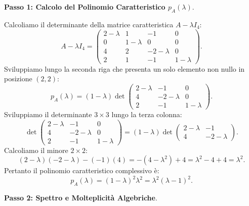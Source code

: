 \begin{dimostrazione}
\textbf{Passo 1: Calcolo del Polinomio Caratteristico $p_A(\lambda)$}.

Calcoliamo il determinante della matrice caratteristica $A - \lambda I_4$:
\begin{equation}
    A - \lambda I_4 = \begin{pmatrix}
        2 - \lambda & 1 & -1 & 0 \\
        0 & 1 - \lambda & 0 & 0 \\
        4 & 2 & -2 - \lambda & 0 \\
        2 & 1 & -1 & 1 - \lambda
    \end{pmatrix}.
\end{equation}
Sviluppiamo lungo la seconda riga che presenta un solo elemento non nullo in posizione $(2,2)$:
\begin{equation}
    p_A(\lambda) = (1 - \lambda) \det \begin{pmatrix}
        2 - \lambda & -1 & 0 \\
        4 & -2 - \lambda & 0 \\
        2 & -1 & 1 - \lambda
    \end{pmatrix}.
\end{equation}
Sviluppiamo il determinante $3 \times 3$ lungo la terza colonna:
\begin{equation}
    \det \begin{pmatrix} 2 - \lambda & -1 & 0 \\ 4 & -2 - \lambda & 0 \\ 2 & -1 & 1 - \lambda \end{pmatrix} = (1 - \lambda) \det \begin{pmatrix} 2 - \lambda & -1 \\ 4 & -2 - \lambda \end{pmatrix}.
\end{equation}
Calcoliamo il minore $2 \times 2$:
\begin{equation}
    (2 - \lambda)(-2 - \lambda) - (-1)(4) = - (4 - \lambda^2) + 4 = \lambda^2 - 4 + 4 = \lambda^2.
\end{equation}
Pertanto il polinomio caratteristico complessivo è:
\begin{equation}
    p_A(\lambda) = (1 - \lambda)^2 \lambda^2 = \lambda^2 (\lambda - 1)^2.
\end{equation}

\textbf{Passo 2: Spettro e Molteplicità Algebriche}.


\end{dimostrazione}

